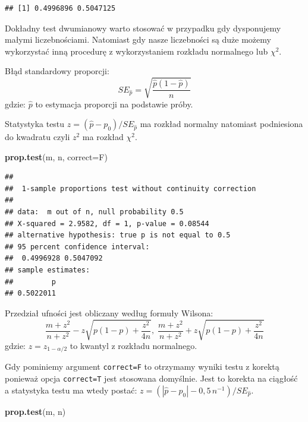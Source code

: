 \documentclass[polish,]{book}
\newenvironment{Shaded}{\begin{snugshade}}{\end{snugshade}}
\newcommand{\DataTypeTok}[1]{\textcolor[rgb]{0.13,0.29,0.53}{#1}}
\newcommand{\KeywordTok}[1]{\textcolor[rgb]{0.13,0.29,0.53}{\textbf{#1}}}
\newcommand{\NormalTok}[1]{#1}
\begin{document}
\begin{verbatim}
## [1] 0.4996896 0.5047125
\end{verbatim}

Dokładny test dwumianowy warto stosować w przypadku gdy dysponujemy małymi liczebnościami. Natomiast gdy nasze liczebności są duże możemy wykorzystać inną procedurę z wykorzystaniem rozkładu normalnego lub \(\chi^2\).

Błąd standardowy proporcji:
\begin{equation}
SE_{\hat{p}}=\sqrt{\frac{\hat{p}(1-\hat{p})}{n}}
\label{eq:wz1156}
\end{equation}
gdzie: \(\hat{p}\) to estymacja proporcji na podstawie próby.

Statystyka testu \(z=(\hat{p}-p_0)/SE_{\hat{p}}\) ma rozkład normalny natomiast podniesiona do kwadratu czyli \(z^2\) ma rozkład \(\chi^2\).

\begin{Shaded}
\begin{Highlighting}[]
\KeywordTok{prop.test}\NormalTok{(m, n, }\DataTypeTok{correct=}\NormalTok{F)}
\end{Highlighting}
\end{Shaded}

\begin{verbatim}
## 
##  1-sample proportions test without continuity correction
## 
## data:  m out of n, null probability 0.5
## X-squared = 2.9582, df = 1, p-value = 0.08544
## alternative hypothesis: true p is not equal to 0.5
## 95 percent confidence interval:
##  0.4996928 0.5047092
## sample estimates:
##         p 
## 0.5022011
\end{verbatim}

Przedział ufności jest obliczany według formuły Wilsona:
\begin{equation}
\frac{m+z^2}{n+z^2}-z\sqrt{p(1-p)+\frac{z^2}{4n}},\;\frac{m+z^2}{n+z^2}+z\sqrt{p(1-p)+\frac{z^2}{4n}}
\label{eq:wz1157}
\end{equation}
gdzie: \(z=z_{1-\alpha/2}\) to kwantyl z rozkładu normalnego.

Gdy pominiemy argument \texttt{correct=F} to otrzymamy wyniki testu z korektą ponieważ opcja \texttt{correct=T} jest stosowana domyślnie. Jest to korekta na ciągłość a statystyka testu ma wtedy postać: \(z=\left(|\hat{p}-p_0|-0,5\,n^{-1}\right)/SE_{\hat{p}}\).

\begin{Shaded}
\begin{Highlighting}[]
\KeywordTok{prop.test}\NormalTok{(m, n)}
\end{Highlighting}
\end{Shaded}
\end{document}
